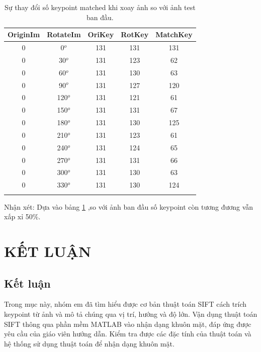 \documentclass[conference]{IEEEtran}
\begin{document}
\begin{table}[htb]
\caption{Sự thay đổi số keypoint matched khi xoay ảnh so với ảnh test ban đầu. }
\centering
\label{t:observed_psrs}
\begin{tabular}{ccccc}
\noalign{\smallskip} \hline \hline \noalign{\smallskip
}
OriginIm & RotateIm & OriKey & RotKey & MatchKey \\
\hline
0        & 0$^o$            & 131 	&131		&131 	\\
0        & 30$^o$           & 131 	&123		&62		\\
0        & 60$^o$           & 131 	&130		&63		\\
0        & 90$^o$           & 131 	&127		&120	\\
0        & 120$^o$          & 131 	&121		&61		\\
0        & 150$^o$          & 131 	&131		&67		\\
0		 & 180$^o$			& 131 	&130		&125	\\
0		 & 210$^o$			& 131 	&123		&61		\\
0        & 240$^o$          & 131 	&124		&65		\\
0        & 270$^o$          & 131 	&131		&66		\\
0        & 300$^o$          & 131 	&130		&63		\\
0        & 330$^o$          & 131 	&130		&124	\\


\noalign{\smallskip} \hline \noalign{\smallskip}
\end{tabular}
\end{table}

Nhận xét: Dựa vào bảng \ref{t:observed_psrs} ,so với ảnh ban đầu số keypoint còn tương đương vẫn xấp xỉ 50$\%$. 
\medskip
\section{KẾT LUẬN}
\label{Sec:KetLuan}
\subsection{Kết luận}
Trong mục này, nhóm em đã tìm hiểu được cơ bản thuật toán SIFT cách trích keypoint từ ảnh và mô tả chúng qua vị trí, hướng và độ lớn. Vận dụng thuật toán SIFT thông qua phần mềm MATLAB vào nhận dạng khuôn mặt, đáp ứng được yêu cầu của giáo viên hướng dẫn. Kiểm tra được các đặc tính của thuật toán và hệ thống sử dụng thuật toán để nhận dạng khuôn mặt.
\end{document}
